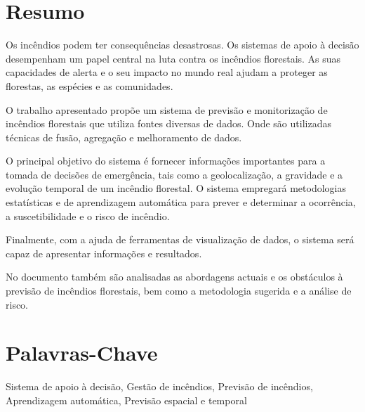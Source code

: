 \thispagestyle{plain}

\section*{Resumo}
\label{sec:resumo}
Os incêndios podem ter consequências desastrosas. Os sistemas de apoio à decisão desempenham um papel central na luta contra os incêndios florestais. As suas capacidades de alerta e o seu impacto no mundo real ajudam a proteger as florestas, as espécies e as comunidades.

O trabalho apresentado propõe um sistema de previsão e monitorização de incêndios florestais que utiliza fontes diversas de dados. Onde são utilizadas técnicas de fusão, agregação e melhoramento de dados.

O principal objetivo do sistema é fornecer informações importantes para a tomada de decisões de emergência, tais como a geolocalização, a gravidade e a evolução temporal de um incêndio florestal. O sistema empregará metodologias estatísticas e de aprendizagem automática para prever e determinar a ocorrência, a suscetibilidade e o risco de incêndio.


Finalmente, com a ajuda de ferramentas de visualização de dados, o sistema será capaz de apresentar informações e resultados.


No documento também são analisadas as abordagens actuais e os obstáculos à previsão de incêndios florestais, bem como a metodologia sugerida e a análise de risco.




\section*{Palavras-Chave}
\label{sec:palavras}

Sistema de apoio à decisão, Gestão de incêndios, Previsão de incêndios, Aprendizagem automática, Previsão espacial e temporal